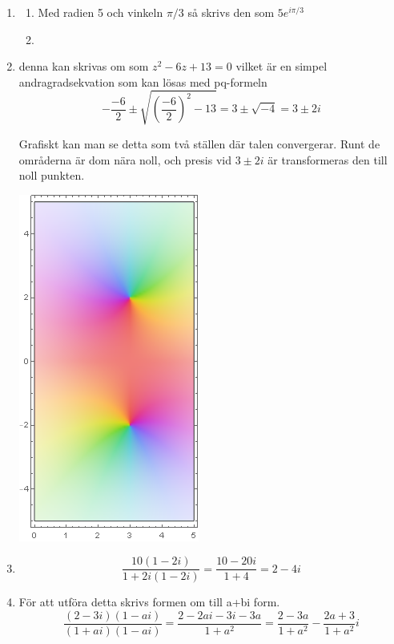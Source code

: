 \documentclass[a4paper,12pt]{article}
\begin{document}
\begin{enumerate}
\begin{enumerate}
          \end{enumerate}
          \item \begin{enumerate}
                \item Med radien 5 och vinkeln $\pi/3$ så 
                skrivs den som $5e^{i\pi/3}$

                \item 
          \end{enumerate}

          \item denna kan skrivas om som 
          $z^2-6z+13=0$ vilket är en simpel andragradsekvation som
          kan lösas med pq-formeln 
          $$-\frac{-6}{2}\pm\sqrt{(\frac{-6}{2})^2-13}=3\pm\sqrt{-4}=3\pm 2i$$
          
          Grafiskt kan man se detta som två ställen där talen convergerar.
          Runt de områderna är dom nära noll, och presis vid $3\pm 2i$ är 
          transformeras den till noll punkten.
          \begin{center}
                \includegraphics[scale=0.6]{Figur 2.png}
          \end{center}
          \item 
          $$\frac{10(1-2i)}{1+2i(1-2i)}=\frac{10-20i}{1+4}=2-4i$$

          \item För att utföra detta skrivs formen om till a+bi form.
          $$\frac{(2-3i)(1-ai)}{(1+ai)(1-ai)}=\frac{2-2ai-3i-3a}{1+a^2}=\frac{2-3a}{1+a^2}-\frac{2a+3}{1+a^2}i$$


\end{enumerate}
\end{document}
